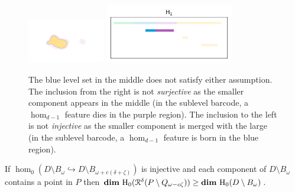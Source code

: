 \begin{figure}[htbp]
  \includegraphics[trim=300 150 300 200, clip, width=0.3\textwidth]{scripts/figures/surf/ass1_D_top.png}
  \includegraphics[width=0.5\textwidth]{scripts/figures/scalar_barcode_H1-masked.png}
  \caption{The blue level set in the middle does not satisfy either assumption.
    The inclusion from the right is not \emph{surjective} as the smaller component appears in the middle (in the sublevel barcode, a $\hom_{d-1}$ feature dies in the purple region).
    The inclusion to the left is not \emph{injective} as the smaller component is merged with the large (in the sublevel barcode, a $\hom_{d-1}$ feature is born in the blue region).}\label{fig:assumption1}
\end{figure}


\begin{lemma}\label{lem:assumption2}
  If $\hom_0(D\setminus B_\omega\hookrightarrow D\setminus B_{\omega+c(\delta+\zeta)})$ is injective and each component of $D\setminus B_\omega$ contains a point in $P$ then $\mathbf{dim}~\mathrm{H}_0(\mathcal{R}^\delta(P\setminus Q_{\omega-c\zeta})) \geq \mathbf{dim}~\mathrm{H}_0(D\setminus B_\omega)$.
\end{lemma}

